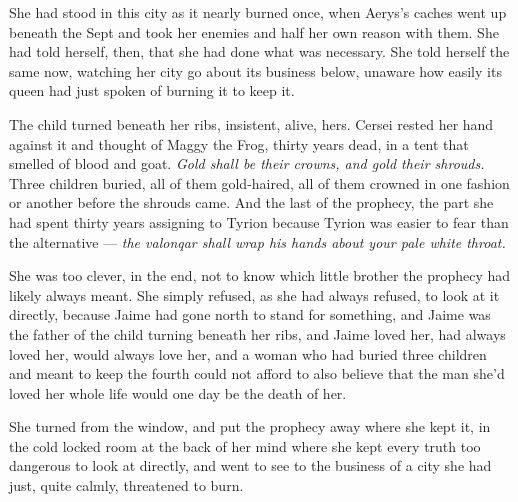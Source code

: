 She had stood in this city as it nearly burned once, when Aerys’s caches went up beneath the Sept and took her enemies and half her own reason with them. She had told herself, then, that she had done what was necessary. She told herself the same now, watching her city go about its business below, unaware how easily its queen had just spoken of burning it to keep it.

The child turned beneath her ribs, insistent, alive, hers. Cersei rested her hand against it and thought of Maggy the Frog, thirty years dead, in a tent that smelled of blood and goat. \textit{Gold shall be their crowns, and gold their shrouds.} Three children buried, all of them gold-haired, all of them crowned in one fashion or another before the shrouds came. And the last of the prophecy, the part she had spent thirty years assigning to Tyrion because Tyrion was easier to fear than the alternative — \textit{the valonqar shall wrap his hands about your pale white throat.}

She was too clever, in the end, not to know which little brother the prophecy had likely always meant. She simply refused, as she had always refused, to look at it directly, because Jaime had gone north to stand for something, and Jaime was the father of the child turning beneath her ribs, and Jaime loved her, had always loved her, would always love her, and a woman who had buried three children and meant to keep the fourth could not afford to also believe that the man she’d loved her whole life would one day be the death of her.

She turned from the window, and put the prophecy away where she kept it, in the cold locked room at the back of her mind where she kept every truth too dangerous to look at directly, and went to see to the business of a city she had just, quite calmly, threatened to burn.